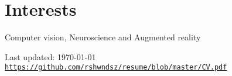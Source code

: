 \documentclass[letterpaper]{article}
\def\footerlink{https://github.com/rshwndsz/resume/blob/master/CV.pdf}
\renewenvironment{itemize}{
  \begin{list}{}{
    \setlength{\leftmargin}{1.5em}
  }
}{
  \end{list}
}
\begin{document}
\section*{Interests}
  \begin{itemize}
    \item Computer vision, Neuroscience and Augmented reality
  \end{itemize}

\bigskip
\begin{center}
  \begin{footnotesize}
    Last updated: \today \\
    \href{\footerlink}{\texttt{\footerlink}}
  \end{footnotesize}
\end{center}
\end{document}
